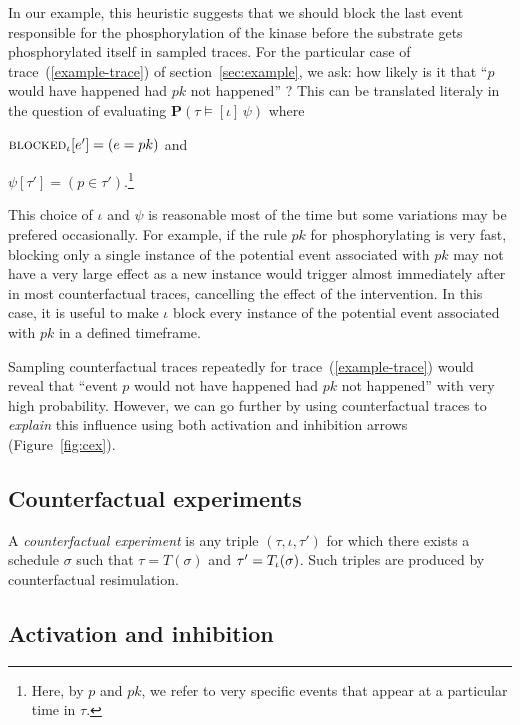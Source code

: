 In our example, this heuristic suggests that we should
block the last event responsible for the phosphorylation of the kinase
before the substrate gets phosphorylated itself in sampled traces. For
the particular case of trace~(\ref{example-trace}) of
section~\ref{sec:example}, we ask: how likely is it that ``$p$ would
have happened had $pk$ not happened'' ?  This can be translated
literaly in the question of evaluating
$\mathbf{P}(\tau \!\models\! [\iota] \, \psi)$ where
\begin{inparaenum}[(i)]
\item ${\textsc{blocked}}_{\iota}[e'] = (e = pk)$ and
\item $\psi[\tau'] = (p \in \tau')$.\footnote{Here, by $p$ and $pk$,
    we refer to very specific events that appear at a particular time
    in $\tau$.}
\end{inparaenum}
This choice of $\iota$ and $\psi$ is reasonable most of the
time but some variations may be prefered occasionally. For example, if
the rule $pk$ for phosphorylating is very fast, blocking only a single
instance of the potential event associated with $pk$ may not have a
very large effect as a new instance would trigger almost immediately
after in most counterfactual traces, cancelling the effect of the
intervention.  In this case, it is useful to make $\iota$ block every
instance of the potential event associated with $pk$ in a defined
timeframe.

Sampling counterfactual traces repeatedly for
trace~(\ref{example-trace}) would reveal that ``event $p$ would not
have happened had $pk$ not happened'' with very high probability.
However, we can go further by using counterfactual traces to
\textit{explain} this influence using both activation and inhibition
arrows (Figure~\ref{fig:cex}).


\subsection{Counterfactual experiments}

A \textit{counterfactual experiment} is any triple
$(\tau, \iota, \tau')$ for which there exists a schedule $\sigma$ such
that $\tau = T(\sigma)$ and $\tau' = {T_\iota}{}(\sigma)$. Such triples
are produced by counterfactual resimulation.

\subsection{Activation and inhibition}


